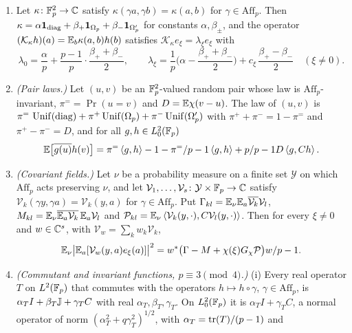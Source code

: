 \begin{lemma}\label{lem:spec:affpair}
\leavevmode
\begin{enumerate}[label=\textup{(\alph*)}]
\item Let $\kappa\colon\mathbb F_p^2\to\mathbb C$ satisfy $\kappa(\gamma a,\gamma b)=\kappa(a,b)$ for
  $\gamma\in\mathrm{Aff}_p$. Then
  $\kappa=\alpha\mathbf 1_{\rm diag}+\beta_+\mathbf 1_{\Omega_{p}}+\beta_-\mathbf 1_{\Omega_{p}'}$ for
  constants $\alpha,\beta_\pm$, and the operator $(\mathcal K_\kappa h)(a)=\mathbb E_b\kappa(a,b)h(b)$
  satisfies $\mathcal K_\kappa e_\xi=\lambda_\xi e_\xi$ with
  \[
    \lambda_0=\frac\alpha p+\frac{p-1}p\cdot\frac{\beta_++\beta_-}2,\qquad
    \lambda_\xi=\frac1p\Big(\alpha-\frac{\beta_++\beta_-}2\Big)+c_\xi\,\frac{\beta_+-\beta_-}2
    \quad(\xi\ne0).
  \]
\item \emph{(Pair laws.)} Let $(u,v)$ be an $\mathbb F_p^2$-valued random pair whose law is
  $\mathrm{Aff}_p$-invariant, $\pi^==\Pr(u=v)$ and $D=\mathbb E\chi(v-u)$. The law of $(u,v)$
  is $\pi^=\,\operatorname{Unif}(\mathrm{diag})+\pi^+\operatorname{Unif}(\Omega_{p})+\pi^-\operatorname{Unif}(\Omega_{p}')$ with
  $\pi^++\pi^-=1-\pi^=$ and $\pi^+-\pi^-=D$, and for all $g,h\in L^2_0(\mathbb F_p)$
  \begin{equation}\label{eq:spec:affpair}
    \mathbb E\big[\overline{g(u)}h(v)\big]=\pi^=\left\langle g,h\right\rangle-1-\pi^=/p-1\left\langle g,h\right\rangle+p/p-1D\left\langle g,Ch\right\rangle.
  \end{equation}
\item \emph{(Covariant fields.)} Let $\nu$ be a probability measure on a finite set
  $\mathcal Y$ on which $\mathrm{Aff}_p$ acts preserving $\nu$, and let
  $\mathcal V_1,\dots,\mathcal V_s\colon\mathcal Y\times\mathbb F_p\to\mathbb C$ satisfy
  $\mathcal V_k(\gamma y,\gamma a)=\mathcal V_k(y,a)$ for $\gamma\in\mathrm{Aff}_p$. Put
  $\Gamma_{kl}=\mathbb E_\nu\mathbb E_a\overline{\mathcal V_k}\mathcal V_l$,
  $M_{kl}=\mathbb E_\nu\overline{\mathbb E_a\mathcal V_k}\,\mathbb E_a\mathcal V_l$ and
  $\mathcal P_{kl}=\mathbb E_\nu\left\langle \mathcal V_k(y,\cdot),C\mathcal V_l(y,\cdot)\right\rangle$. Then for every
  $\xi\ne0$ and $w\in\mathbb C^s$, with $\mathcal V_w=\sum_kw_k\mathcal V_k$,
  \[
    \mathbb E_\nu\big|\mathbb E_a[\mathcal V_w(y,a)e_\xi(a)]\big|^2
    =w^*\big(\Gamma-M+\chi(\xi)G_\chi\mathcal P\big)w/p-1.
  \]
\item \emph{(Commutant and invariant functions, $p\equiv3\pmod4$.)} (i) Every real
  operator $T$ on $L^2(\mathbb F_p)$ that commutes with the operators $h\mapsto h\circ\gamma$,
  $\gamma\in\mathrm{Aff}_p$, is $\alpha_TI+\beta_T\mathbb J+\gamma_TC$ with real
  $\alpha_T,\beta_T,\gamma_T$. On $L^2_0(\mathbb F_p)$ it is $\alpha_TI+\gamma_TC$, a normal
  operator of norm $(\alpha_T^2+q\gamma_T^2)^{1/2}$, with $\alpha_T=\operatorname{tr}(T)/(p-1)$ and

\end{enumerate}
\end{lemma}

